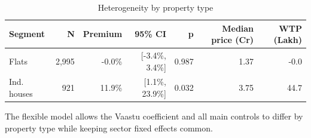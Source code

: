 \begin{table}[!htbp]
\centering
\caption{Heterogeneity by property type}
\label{tab:heterogeneity}
{\small\setlength{\tabcolsep}{4pt}
\begin{tabular}{lrrrrrr}
\toprule
Segment & N & Premium & 95\% CI & p & Median price (Cr) & WTP (Lakh) \\
\midrule
Flats & 2,995 & -0.0\% & [-3.4\%, 3.4\%] & 0.987 & 1.37 & -0.0 \\
Ind. houses & 921 & 11.9\% & [1.1\%, 23.9\%] & 0.032 & 3.75 & 44.7 \\
\bottomrule
\end{tabular}

}
\vspace{0.3em}
\par\begin{minipage}{0.95\linewidth}\footnotesize The flexible model allows the Vaastu coefficient and all main controls to differ by property type while keeping sector fixed effects common.\end{minipage}
\end{table}
